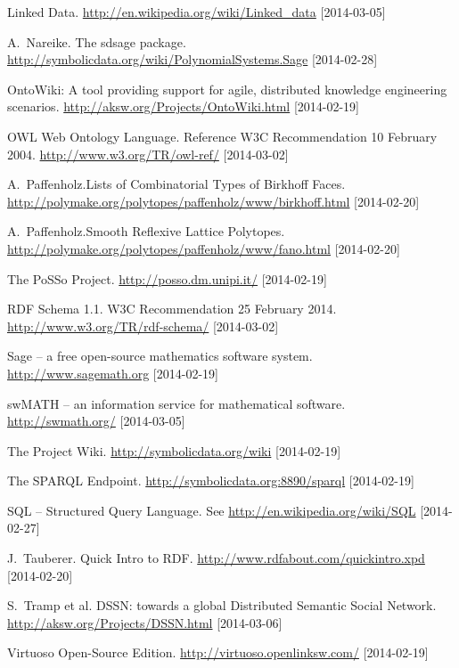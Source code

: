 \documentclass[a4paper,11pt]{article}
\begin{document}
\begin{multicols}{2}
\begin{thebibliography}{1}
 Linked Data.  \newblock
  \url{http://en.wikipedia.org/wiki/Linked_data} [2014-03-05]

 A.\ Nareike. The {\SD} sdsage package.  \newblock
  \url{http://symbolicdata.org/wiki/PolynomialSystems.Sage} [2014-02-28]

 OntoWiki: A tool providing support for agile, distributed
  knowledge engineering scenarios. \newblock
  \url{http://aksw.org/Projects/OntoWiki.html} [2014-02-19]

 OWL Web Ontology Language.  Reference W3C Recommendation 10
  February 2004. \newblock \url{http://www.w3.org/TR/owl-ref/} [2014-03-02]

 A.\ Paffenholz.\newblock Lists of Combinatorial Types
  of Birkhoff Faces. \newblock
  \url{http://polymake.org/polytopes/paffenholz/www/birkhoff.html}
      [2014-02-20]

 A.\ Paffenholz.\newblock Smooth Reflexive Lattice
  Polytopes.  \newblock
  \url{http://polymake.org/polytopes/paffenholz/www/fano.html} [2014-02-20]

 The PoSSo Project. \newblock \url{http://posso.dm.unipi.it/}
  [2014-02-19]

 RDF Schema 1.1.  W3C Recommendation 25 February 2014. \newblock
  \url{http://www.w3.org/TR/rdf-schema/} [2014-03-02]

 Sage -- a free open-source mathematics software system.
  \newblock \url{http://www.sagemath.org} [2014-02-19]

 swMATH -- an information service for mathematical software.
  \newblock \url{http://swmath.org/} [2014-03-05]

 The {\SD} Project Wiki.
  \newblock \url{http://symbolicdata.org/wiki} [2014-02-19]

 The {\SD} SPARQL Endpoint.
  \newblock \url{http://symbolicdata.org:8890/sparql} [2014-02-19]

 SQL -- Structured Query Language. \newblock See
  \url{http://en.wikipedia.org/wiki/SQL} [2014-02-27]

 J.\ Tauberer. \newblock Quick Intro to RDF. \newblock
  \url{http://www.rdfabout.com/quickintro.xpd} [2014-02-20]

 S.\ Tramp et al. \newblock DSSN: towards a global Distributed
  Semantic Social Network. \url{http://aksw.org/Projects/DSSN.html}
  [2014-03-06]

 Virtuoso Open-Source Edition. \newblock
  \url{http://virtuoso.openlinksw.com/} [2014-02-19]

\end{thebibliography}


\end{multicols}
\end{document}
